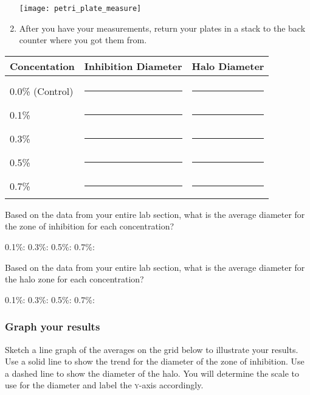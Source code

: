 \documentclass[12pt]{exam}
\begin{document}
\begin{questions}
\begin{enumerate}
		{\centering\texttt{[image: petri\_plate\_measure]}\par
		}

	\item After you have your measurements, return your plates in a stack to the back counter where you got them from.
	
\end{enumerate}

\begin{longtable}[c]{lcc}
	\toprule
		Concentation	&	Inhibition Diameter	&	Halo Diameter \tabularnewline
	\midrule
		& & \tabularnewline[0.75em]
		0.0\% (Control)	& \rule{0.75in}{0.4pt} & \rule{0.75in}{0.4pt} \tabularnewline[2em]
		0.1\%	& \rule{0.75in}{0.4pt} & \rule{0.75in}{0.4pt} \tabularnewline[2em]
		0.3\%	& \rule{0.75in}{0.4pt} & \rule{0.75in}{0.4pt} \tabularnewline[2em]
		0.5\%	& \rule{0.75in}{0.4pt} & \rule{0.75in}{0.4pt} \tabularnewline[2em]
		0.7\%	& \rule{0.75in}{0.4pt} & \rule{0.75in}{0.4pt} \tabularnewline
	\bottomrule
\end{longtable}

\question
Based on the data from your entire lab section, what is the average diameter for the zone of inhibition for each concentration?

\vspace*{0.5\baselineskip}

0.1\%: \hfill 0.3\%: \hfill 0.5\%: \hfill 0.7\%: \hfill \phantom{|}

\vspace{0.5\baselineskip}

\question
Based on the data from your entire lab section, what is the average diameter for the halo zone for each concentration?

\vspace*{0.5\baselineskip}

0.1\%: \hfill 0.3\%: \hfill 0.5\%: \hfill 0.7\%: \hfill \phantom{|}

\vspace{0.5\baselineskip}


\subsubsection*{Graph your results}

Sketch a line graph of the averages on the grid below to illustrate your results. Use a solid line to show the trend for the diameter of the zone of inhibition. Use a dashed line to show the diameter of the halo. You will determine the scale to use for the diameter and label the \textsc{y}-axis accordingly.


\end{questions}
\end{document}
